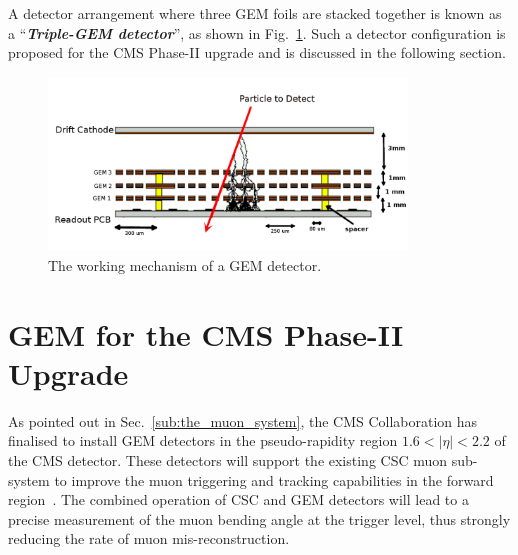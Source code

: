 A detector arrangement where three GEM foils are stacked together is known as a ``\textit{\textbf{Triple-GEM detector}}'', as shown in Fig.~\ref{fig:gemgaps}. Such a detector configuration is proposed for the CMS Phase-II upgrade and is discussed in the following section.
\begin{figure}[!htbp]
    \begin{center}
        \includegraphics[width=0.85\textwidth]{figures/GEM/triple_gem.png}
        \caption{The working mechanism of a GEM detector.}
        \label{fig:gemgaps}
    \end{center}
\end{figure} 


\section{GEM for the CMS Phase-II Upgrade} %
\label{sec:gem_for_cms}
As pointed out in Sec.~\ref{sub:the_muon_system},  the CMS Collaboration has finalised to install GEM detectors in the pseudo-rapidity region $1.6 < |\eta| < 2.2$ of the CMS detector.
These detectors will support the existing CSC muon sub-system to improve the muon triggering and tracking capabilities in the forward region~\cite{Colaleo:2021453}.
The combined operation of CSC and GEM detectors will lead to a precise measurement of the muon bending angle at the trigger level, thus strongly reducing the rate of muon mis-reconstruction.

